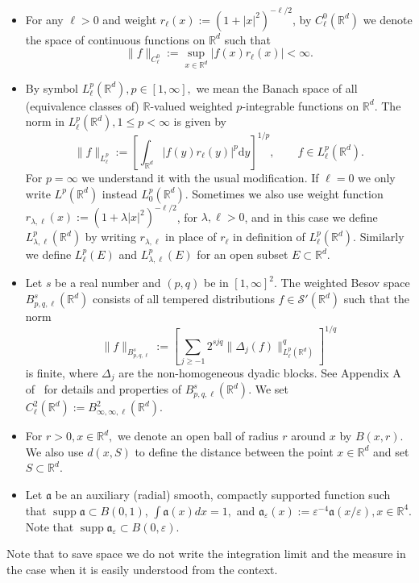 \documentclass{article}
\newcommand{\assign}{:=}
\newcommand{\mathd}{\mathrm{d}}
\newcommand{\tmop}[1]{\ensuremath{\operatorname{#1}}}
\newenvironment{itemizedot}{\begin{itemize} \renewcommand{\labelitemi}{$\bullet$}\renewcommand{\labelitemii}{$\bullet$}\renewcommand{\labelitemiii}{$\bullet$}\renewcommand{\labelitemiv}{$\bullet$}}{\end{itemize}}
\begin{document}
\begin{itemizedot}
  \item For any $\ell > 0$ and weight $r_{\ell} (x) \assign (1 + | x |^2)^{-
  \ell / 2}$, by $C_{\ell}^0 (\mathbb{R}^d)$ we denote the space of continuous functions on $\mathbb{R}^d$ such that
  \[ \| f \|_{C_{\ell}^0} {\assign \sup_{x \in \mathbb{R}^d}} 
     | f (x) r_{\ell} (x) | < \infty . \]
  \item By symbol $L^p_{\ell} (\mathbb{R}^d), p \in [1, \infty],$ we mean the
  Banach space of all (equivalence classes of) $\mathbb{R}$-valued weighted
  $p$-integrable functions on $\mathbb{R}^d$. The norm in $L^p_{\ell}
  (\mathbb{R}^d), 1 \leqslant p < \infty$ is given by
  \[ \| f \|_{L^p_{\ell}} \assign \left[ \int_{\mathbb{R}^d} |
     f (y) r_{\ell} (y) |^p \mathd y \right]^{1 / p}, \qquad f \in L^p_{\ell}
     (\mathbb{R}^d) . \]
  For $p = \infty$ we understand it with the usual modification. If $\ell = 0$
  we only write $L^p (\mathbb{R}^d)$ instead $L^p_0 (\mathbb{R}^d)$. Sometimes
  we also use weight function $r_{\lambda, \ell} (x) \assign (1 + \lambda | x
  |^2)^{- \ell / 2}$, for $\lambda, \ell >0$,  and in this case we define $L^p_{\lambda, \ell}
  (\mathbb{R}^d)$ by writing $r_{\lambda, \ell}$ in place of $r_{\ell}$ in
  definition of $L^p_{\ell} (\mathbb{R}^d)$. Similarly we define $L^p_{\ell}(E)$ and $L^p_{\lambda, \ell}(E)$ for an open subset $E \subset \mathbb{R}^d$. 
  
  \item Let $s$ be a real number and $(p, q)$ be in $[1, \infty]^2$. The
  weighted Besov space $B_{p, q, \ell}^s (\mathbb{R}^d)$ consists of all
  tempered distributions $f \in \mathcal{S}' (\mathbb{R}^d)$ such that the
  norm
  \[ \| f \|_{B_{p, q, \ell}^s} \assign \left[ \sum_{j \geqslant - 1} 2^{s j
     q} \| \Delta_j (f) \|_{L^p_{\ell} (\mathbb{R}^d)}^q \right]^{1 / q} \]
  is finite, where $\Delta_j$ are the non-homogeneous dyadic blocks. See
  Appendix A of~{\cite{AVG2021}} for details and properties of $B_{p, q,
  \ell}^s (\mathbb{R}^d)$. We set $C_{\ell}^2(\mathbb{R}^d) := B_{\infty, \infty,
  \ell}^2 (\mathbb{R}^d)$. 
  
  \item For $r > 0, x \in \mathbb{R}^d,$ we denote an open ball of radius $r$
  around $x$ by $B (x, r)$. We also use $d (x, S)$ to define the distance
  between the point $x \in \mathbb{R}^d $ and set $S \subset \mathbb{R}^d .$
  
  \item Let $\mathfrak{a}$ be an auxiliary (radial) smooth, compactly
  supported function such that $\tmop{supp} \mathfrak{a} \subset B (0, 1)$,
  $\int \mathfrak{a} (x) d x = 1,$ and $\mathfrak{a}_{\varepsilon} (x) \assign
  \varepsilon^{- 4} \mathfrak{a} (x / \varepsilon), x \in \mathbb{R}^4$. Note
  that $\tmop{supp} \mathfrak{a}_{\varepsilon} \subset B (0, \varepsilon) .$
\end{itemizedot}
Note that to save space we do not write the integration limit and the measure in the case when it is easily understood from the context.
\end{document}
